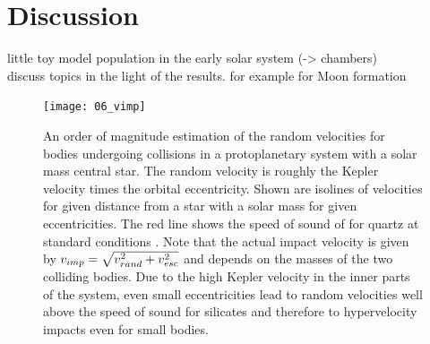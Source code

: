 \cite{2011arXiv1105.4616E}

\cite{Chambers:2001p2105}
\citep{chandrasekhar1969ellipsoidal}
\cite{Lissauer:1993p56}
\cite{Wetherill:1993p3351}

\cite{Leinhardt:2011p4060}

\section{Discussion}
little toy model population in the early solar system (-> chambers) \\
discuss topics in the light of the results. for example for Moon formation

\begin{figure}
\begin{center}
\texttt{[image: 06\_vimp]}
\caption{An order of magnitude estimation of the random velocities for bodies undergoing collisions in a protoplanetary system with a solar mass central star. The random velocity is roughly the Kepler velocity times the orbital eccentricity. Shown are isolines of velocities for given distance from a star with a solar mass for given eccentricities. The red line shows the speed of sound of for quartz at standard conditions \cite{Melosh:2007p3502}. Note that the actual impact velocity is given by $v_{imp} = \sqrt{ v_{rand}^2 + v_{esc}^2}$ and depends on the masses of the two colliding bodies. Due to the high Kepler velocity in the inner parts of the system, even small eccentricities lead to random velocities well above the speed of sound for silicates and therefore to hypervelocity impacts even for small bodies.}
\label{ch03_fig06}
\end{center}
\end{figure}










